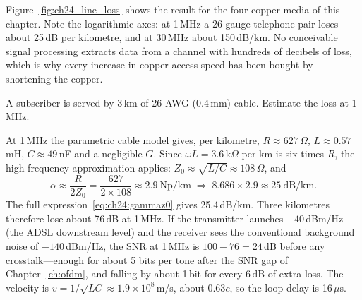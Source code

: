 
Figure~\ref{fig:ch24_line_loss} shows the result for the four copper media of this chapter.
Note the logarithmic axes: at 1\,MHz a 26-gauge telephone pair loses about 25\,dB per
kilometre, and at 30\,MHz about 150\,dB/km. No conceivable signal processing extracts data
from a channel with hundreds of decibels of loss, which is why every increase in copper
access speed has been bought by shortening the copper.

\begin{worked}
A subscriber is served by 3\,km of 26 AWG (0.4\,mm) cable. Estimate the loss at 1\,MHz.

At 1\,MHz the parametric cable model gives, per kilometre, $R\approx627$\,$\Omega$,
$L\approx0.57$\,mH, $C\approx49$\,nF and a negligible $G$. Since $\omega L=3.6$\,k$\Omega$ per
km is six times $R$, the high-frequency approximation applies: $Z_0\approx\sqrt{L/C}\approx
108$\,$\Omega$, and
\[
\alpha\approx\frac{R}{2Z_0}=\frac{627}{2\times108}\approx2.9\ \text{Np/km}
\;\Rightarrow\;8.686\times2.9\approx25\ \text{dB/km}.
\]
The full expression~\eqref{eq:ch24:gammaz0} gives 25.4\,dB/km. Three kilometres therefore lose
about 76\,dB at 1\,MHz. If the transmitter launches $-40$\,dBm/Hz (the ADSL downstream level)
and the receiver sees the conventional background noise of $-140$\,dBm/Hz, the SNR at 1\,MHz is
$100-76=24$\,dB before any crosstalk---enough for about 5 bits per tone after the SNR gap of
Chapter~\ref{ch:ofdm}, and falling by about 1\,bit for every 6\,dB of extra loss. The velocity
is $v=1/\sqrt{LC}\approx1.9\times10^8$\,m/s, about $0.63c$, so the loop delay is 16\,$\mu$s.
\end{worked}



